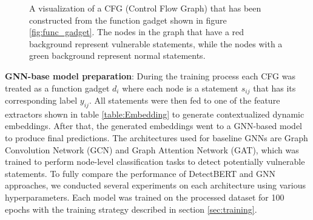 \documentclass{ieeeaccess}
\begin{document}
\begin{figure}[h]
    \centering
    
    \caption{A visualization of a CFG (Control Flow Graph) that has been constructed from the function gadget shown in figure \ref{fig:func_gadget}. The nodes in the graph that have a red background represent vulnerable statements, while the nodes with a green background represent normal statements.}
 \label{fig:cfg}
\end{figure}
 \par \textbf{GNN-base model preparation}:  During the training process  each CFG was treated as a function gadget $d_i$ where each node is a statement $s_{ij}$  that has its corresponding label $y_{ij}$. All statements were then fed to one of the feature extractors shown in table \ref{table:Embedding} to generate contextualized dynamic embeddings.  After that, the generated embeddings  went to a GNN-based model to produce final predictions.  The architectures used for baseline GNNs are Graph Convolution Network (GCN)\cite{GCN} and Graph Attention Network (GAT)\cite{GAT}, which was trained to perform node-level classification tasks to detect potentially vulnerable statements.  To fully compare the performance of DetectBERT and GNN approaches, we conducted several experiments on each architecture using various hyperparameters. Each model was trained on the processed dataset for 100 epochs with the training strategy described in section \ref{sec:training}.
\end{document}
